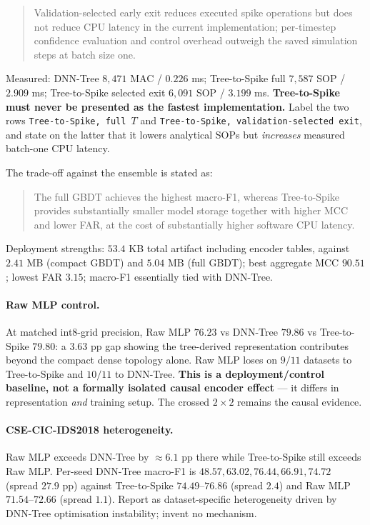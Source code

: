 \begin{quote}
Validation-selected early exit reduces executed spike operations but does not reduce
CPU latency in the current implementation; per-timestep confidence evaluation and
control overhead outweigh the saved simulation steps at batch size one.
\end{quote}

\noindent Measured: DNN-Tree $8{,}471$ MAC / $0.226$ ms; Tree-to-Spike full
$7{,}587$ SOP / $2.909$ ms; Tree-to-Spike selected exit $6{,}091$ SOP / $3.199$ ms.
\textbf{Tree-to-Spike must never be presented as the fastest implementation.} Label
the two rows \texttt{Tree-to-Spike, full $T$} and \texttt{Tree-to-Spike,
validation-selected exit}, and state on the latter that it lowers analytical SOPs but
\emph{increases} measured batch-one CPU latency.

The trade-off against the ensemble is stated as:
\begin{quote}
The full GBDT achieves the highest macro-F1, whereas Tree-to-Spike provides
substantially smaller model storage together with higher MCC and lower FAR, at the
cost of substantially higher software CPU latency.
\end{quote}

\noindent Deployment strengths: $53.4$ KB total artifact including encoder tables,
against $2.41$ MB (compact GBDT) and $5.04$ MB (full GBDT); best aggregate MCC
$90.51$; lowest FAR $3.15$; macro-F1 essentially tied with DNN-Tree.

\paragraph{Raw MLP control.} At matched int8-grid precision, Raw MLP $76.23$ vs
DNN-Tree $79.86$ vs Tree-to-Spike $79.80$: a $3.63$ pp gap showing the tree-derived
representation contributes beyond the compact dense topology alone. Raw MLP loses on
$9/11$ datasets to Tree-to-Spike and $10/11$ to DNN-Tree. \textbf{This is a
deployment/control baseline, not a formally isolated causal encoder effect} --- it
differs in representation \emph{and} training setup. The crossed $2\times2$ remains
the causal evidence.

\paragraph{CSE-CIC-IDS2018 heterogeneity.} Raw MLP exceeds DNN-Tree by $\approx6.1$ pp
there while Tree-to-Spike still exceeds Raw MLP. Per-seed DNN-Tree macro-F1 is
$48.57, 63.02, 76.44, 66.91, 74.72$ (spread $27.9$ pp) against Tree-to-Spike
$74.49$--$76.86$ (spread $2.4$) and Raw MLP $71.54$--$72.66$ (spread $1.1$). Report as
dataset-specific heterogeneity driven by DNN-Tree optimisation instability; invent no
mechanism.

